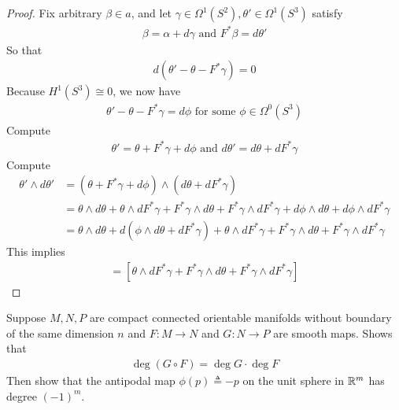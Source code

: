 \documentclass{report}
\begin{document}
\begin{proof}
Fix arbitrary $\beta   \in a$, and let  $\gamma \in \Omega^1(S^2), \theta' \in \Omega^1 (S^3)$ satisfy 
\begin{align*}
\beta  = \alpha  + d\gamma  \text{ and }F^*\beta  = d\theta'
\end{align*}
So that  
\begin{align*}
d(\theta'- \theta - F^* \gamma )=0
\end{align*}
Because $H^1(S^3)\cong  0$, we now have 
\begin{align*}
\theta ' - \theta - F^* \gamma  = d \phi \text{ for some }\phi \in \Omega^0(S^3)
\end{align*}
Compute 
\begin{align*}
\theta' = \theta + F^* \gamma  + d\phi  \text{ and } d \theta ' = d\theta + dF^* \gamma 
\end{align*}
Compute 
\begin{align*}
  \theta ' \wedge  d\theta' &= (\theta + F^* \gamma  + d\phi) \wedge  (d\theta + dF^* \gamma )   \\
  &= \theta \wedge  d\theta + \theta  \wedge  dF^* \gamma  +  F^* \gamma  \wedge  d\theta + F^* \gamma  \wedge  dF^* \gamma  + d\phi \wedge  d\theta + d\phi \wedge  dF^* \gamma \\    
  &= \theta \wedge  d\theta + d(\phi \wedge  d\theta + dF^* \gamma  ) + \theta \wedge  dF^* \gamma  +  F^* \gamma  \wedge  d \theta + F^* \gamma  \wedge  dF^* \gamma   
\end{align*}
This implies 
\begin{align*}
  [\theta ' \wedge  d\theta ' - \theta \wedge  d\theta ]= [\theta \wedge  dF^* \gamma  + F^* \gamma  \wedge  d\theta   +F^* \gamma  \wedge  dF^* \gamma ] 
\end{align*}
\end{proof}
\begin{question}{}{}
Suppose $M,N,P$ are compact connected orientable manifolds without boundary of the same dimension $n$ and  $F:M\rightarrow N$ and $G:N\rightarrow P$ are smooth maps. Shows that 
\begin{align*}
\operatorname{deg}(G \circ F)= \operatorname{deg}G \cdot \operatorname{deg}F
\end{align*}
Then show that the antipodal map $\phi (p)\triangleq -p$ on the unit sphere in $\mathbb{R}^m$ has degree  $(-1)^m$. 
\end{question}
\end{document}
